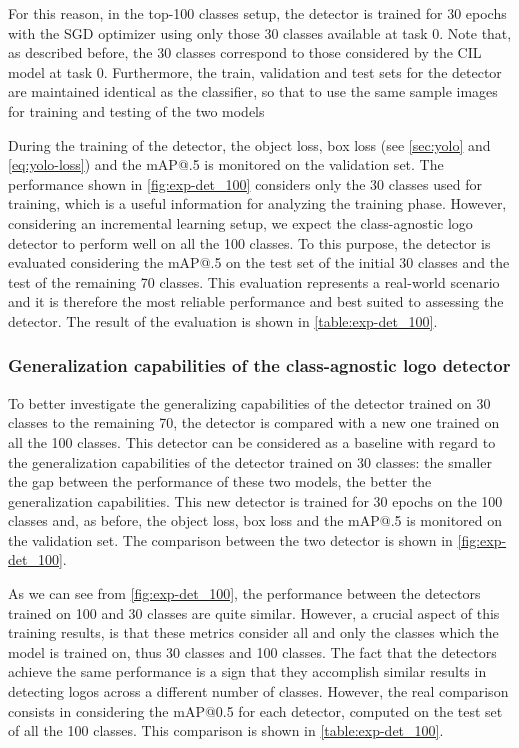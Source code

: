 For this reason, in the top-100 classes setup, the detector is trained for 30 epochs with the SGD optimizer using only those 30 classes available at task 0.
Note that, as described before, the 30 classes correspond to those considered by the CIL model at task 0. Furthermore, the train, validation and test sets for the detector are maintained identical as the classifier, so that to use the same sample images for training and testing of the two models

During the training of the detector, the object loss, box loss (see \autoref{sec:yolo} and \autoref{eq:yolo-loss}) and the mAP@.5 is monitored on the validation set. The performance shown in \autoref{fig:exp-det_100} considers only the 30 classes used for training, which is a useful information for analyzing the training phase. However, considering an incremental learning setup, we expect the class-agnostic logo detector to perform well on all the 100 classes.
To this purpose, the detector is evaluated considering the mAP@.5 on the test set of the initial 30 classes and the test of the remaining 70 classes.
This evaluation represents a real-world scenario and it is therefore the most reliable performance and best suited to assessing the detector.
The result of the evaluation is shown in \autoref{table:exp-det_100}.


\subsubsection{Generalization capabilities of the class-agnostic logo detector}
To better investigate the generalizing capabilities of the detector trained on 30 classes to the remaining 70, the detector is compared with a new one trained on all the 100 classes.
This detector can be considered as a baseline with regard to the generalization capabilities of the detector trained on 30 classes: the smaller the gap between the performance of these two models, the better the generalization capabilities.
This new detector is trained for 30 epochs on the 100 classes and, as before, the object loss, box loss and the mAP@.5 is monitored on the validation set. The comparison between the two detector is shown in \autoref{fig:exp-det_100}.

As we can see from \autoref{fig:exp-det_100}, the performance between the detectors trained on 100 and 30 classes are quite similar. However, a crucial aspect of this training results, is that these metrics consider all and only the classes which the model is trained on, thus 30 classes and 100 classes.
The fact that the detectors achieve the same performance is a sign that they accomplish similar results in detecting logos across a different number of classes.
However, the real comparison consists in considering the mAP@0.5 for each detector, computed on the test set of all the 100 classes. This comparison is shown in \autoref{table:exp-det_100}.

